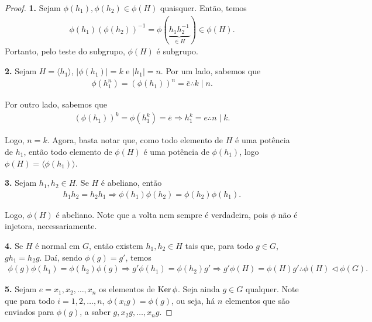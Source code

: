 	\begin{proof}
		\textbf{1.} Sejam $\phi(h_1), \phi(h_2)\in \phi(H)$ quaisquer. Então, temos
		\begin{align*}
		    \phi(h_1)(\phi(h_2))^{-1} = \phi(\underbrace{h_1h_2^{-1}}_{\in H}) \in\phi(H).
		\end{align*}
		Portanto, pelo teste do subgrupo, $\phi(H)$ é subgrupo.
		
		\par\vspace{0.3cm}\hspace{17pt}\textbf{2.} Sejam $H = \langle h_1 \rangle$, $|\phi(h_1)| = k$ 
		e $|h_1| = n$. Por um lado, sabemos que
		\begin{align*}
		    \phi(h_1^n) = (\phi(h_1))^n = \overline{e}\therefore k \mid n.
		\end{align*}
		\par\vspace{0.3cm} Por outro lado, sabemos que
		\begin{align*}
		    (\phi(h_1))^k = \phi(h_1^k) = \overline{e}\Rightarrow h_1^k = e\therefore n\mid k.
		\end{align*}
		\par\vspace{0.3cm} Logo, $n = k$. Agora, basta notar que, como todo elemento de $H$ é uma 
		potência de $h_1$, então todo elemento de $\phi(H)$ é uma potência de $\phi(h_1)$, 
		logo $\phi(H) = \langle \phi(h_1) \rangle$. 
		
		\par\vspace{0.3cm}\hspace{17pt}\textbf{3.} Sejam $h_1, h_2\in H$. Se $H$ é abeliano, então
		\begin{align*}
		    h_1h_2 = h_2h_1 \Rightarrow \phi(h_1)\phi(h_2) = \phi(h_2)\phi(h_1).
		\end{align*}
		\par\vspace{0.3cm} Logo, $\phi(H)$ é abeliano. Note que a volta nem sempre é verdadeira, 
		pois $\phi$ não é injetora, necessariamente.
		
		\par\vspace{0.3cm}\hspace{17pt}\textbf{4.} Se $H$ é normal em $G$, então existem 
		$h_1, h_2\in H$ tais que, para todo $g\in G$, $gh_1 = h_2g$. Daí, sendo $\phi(g) = g'$, temos
		\begin{align*}
		    \phi(g)\phi(h_1) 
		    = \phi(h_2)\phi(g) \Rightarrow g'\phi(h_1) 
		    = \phi(h_2)g' \Rightarrow g'\phi(H) = \phi(H)g' 
		    \therefore \phi(H)\vartriangleleft\phi(G).
		\end{align*}
		\par\vspace{0.3cm}\hspace{17pt}\textbf{5.} Sejam $ e = x_1, x_2, \dots, x_n$ os elementos de $\operatorname{Ker}\phi$.
		Seja ainda $g\in G$ qualquer. Note que para todo $i = 1, 2, \dots, n$, $\phi(x_ig) = \phi(g)$, 
		ou seja, há $n$ elementos que são enviados para $\phi(g)$, a saber $g, x_2g, \dots, x_ng$.
		

\end{proof}
